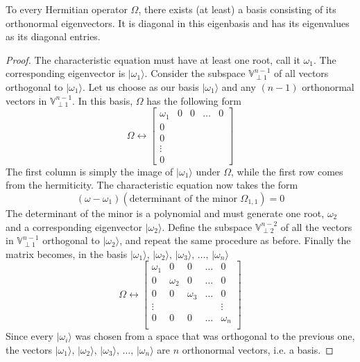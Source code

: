 \documentclass[11pt,fleqn]{book} %
\newcommand{\ket}[1]{| #1\rangle}
\begin{document}
\begin{theorem}
    To every Hermitian operator $\Omega$, there exists (at least) a basis consisting of its orthonormal eigenvectors. It 
    is diagonal in this eigenbasis and has its eigenvalues as its diagonal entries.
\end{theorem}
\begin{proof}
    The characteristic equation must have at least one root, call it $\omega_1$. The corresponding eigenvector is $\ket{\omega_1}$.
    Consider the subspace $\mathbb{V}^{n-1}_{\perp 1}$ of all vectors orthogonal to $\ket{\omega_1}$. Let us choose as our basis
    $\ket{\omega_1}$ and any $(n-1)$ orthonormal vectors in $\mathbb{V}^{n-1}_{\perp 1}$. In this basis, $\Omega$ has the following
    form
    \begin{equation*}
        \Omega\leftrightarrow\left[\begin{array}{ccccc}
            \omega_1 &0 &0 &\dots&0\\
            0\\
            0\\
            \vdots\\
            0
        \end{array}\right]
    \end{equation*}
    The first column is simply the image of $\ket{\omega_1}$ under $\Omega$, while the first row comes from the hermiticity.
    The characteristic equation now takes the form
    \begin{equation*}
        (\omega-\omega_1)(\mbox{determinant of the minor $\Omega_{1,1}$})=0
    \end{equation*}
    The determinant of the minor is a polynomial and must generate one root, $\omega_2$ and a corresponding eigenvector $\ket{\omega_2}$.
    Define the subspace  $\mathbb{V}^{n-2}_{\perp 2}$ of all the vectors in  $\mathbb{V}^{n-1}_{\perp 1}$ orthogonal to $\ket{\omega_2}$, 
    and repeat the same procedure as before. Finally the matrix becomes, in the basis 
    $\ket{\omega_1},\,\ket{\omega_2},\,\ket{\omega_3},\,\dots,\,\ket{\omega_n}$
    \begin{equation*}
        \Omega\leftrightarrow\left[\begin{array}{ccccc}
            \omega_1 &0 &0 &\dots&0\\
            0 &\omega_2&0& \dots &0\\
            0 &0 &\omega_3& \dots &0\\
            \vdots&&&&\vdots\\
            0 &0&0& \dots &\omega_n\\
        \end{array}\right]
    \end{equation*}
    Since every $\ket{\omega_i}$ was chosen from a space that was orthogonal to the previous one, the vectors
    $\ket{\omega_1},\,\ket{\omega_2},\,\ket{\omega_3},\,\dots,\,\ket{\omega_n}$ are $n$ orthonormal vectors, i.e. a basis.
\end{proof}
\end{document}
